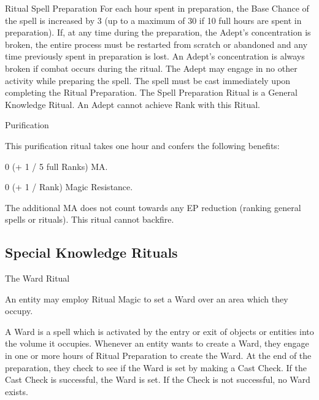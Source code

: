 \begin{multicols}{3}
\begin{ritual}[]{Ritual Spell Preparation}
For each hour spent in preparation, the Base Chance of the spell is
increased by 3 (up to a maximum of 30 if 10 full hours are spent in
preparation).  If, at any time during the preparation, the Adept's
concentration is broken, the entire process must be restarted from
scratch or abandoned and any time previously spent in preparation is
lost.  An Adept's concentration is always broken if combat occurs
during the ritual.  The Adept may engage in no other activity while
preparing the spell.  The spell must be cast immediately upon
completing the Ritual Preparation.  The Spell Preparation Ritual is a
General Knowledge Ritual.  An Adept cannot achieve Rank with this
Ritual.
\end{ritual}

\begin{ritual}[]{Purification}
\label{college:purfication}
\begin{effects}
This purification ritual takes one hour and confers the
following benefits:
\begin{Itemize}
\item 0 (+ 1 / 5 full Ranks) MA.
\item 0 (+ 1 / Rank) Magic Resistance.
\end{Itemize}
The additional MA does not count towards any EP reduction (\eg ranking
general spells or rituals).  This ritual cannot backfire.
\end{effects}
\end{ritual}

\subsection{Special Knowledge Rituals}

\begin{ritual}[]{The Ward Ritual}
\label{college:ward}

\begin{effects}
An entity may employ Ritual Magic to set a Ward over an area which
they occupy.

A Ward is a spell which is activated by the entry or exit of objects
or entities into the volume it occupies. Whenever an entity wants to
create a Ward, they engage in one or more hours of Ritual Preparation
to create the Ward.  At the end of the preparation, they check to see
if the Ward is set by making a Cast Check.  If the Cast Check is
successful, the Ward is set. If the Check is not successful, no Ward
exists.


\end{effects}
\end{ritual}
\end{multicols}
